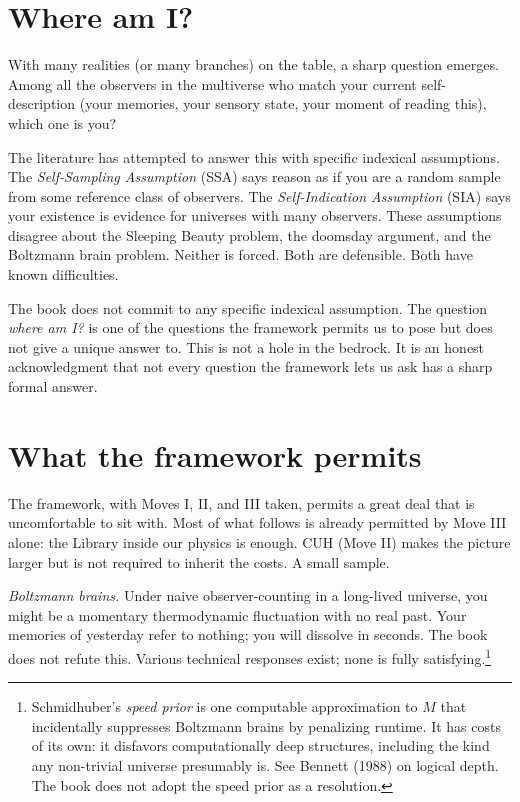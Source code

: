 \section*{Where am I?}

With many realities (or many branches) on the table, a sharp question emerges. Among all the observers in the multiverse who match your current self-description (your memories, your sensory state, your moment of reading this), which one is you?

The literature has attempted to answer this with specific indexical assumptions. The \emph{Self-Sampling Assumption} (SSA) says reason as if you are a random sample from some reference class of observers. The \emph{Self-Indication Assumption} (SIA) says your existence is evidence for universes with many observers. These assumptions disagree about the Sleeping Beauty problem, the doomsday argument, and the Boltzmann brain problem. Neither is forced. Both are defensible. Both have known difficulties.

The book does not commit to any specific indexical assumption. The question \emph{where am I?} is one of the questions the framework permits us to pose but does not give a unique answer to. This is not a hole in the bedrock. It is an honest acknowledgment that not every question the framework lets us ask has a sharp formal answer.

\section*{What the framework permits}

The framework, with Moves I, II, and III taken, permits a great deal that is uncomfortable to sit with. Most of what follows is already permitted by Move III alone: the Library inside our physics is enough. CUH (Move II) makes the picture larger but is not required to inherit the costs. A small sample.

\emph{Boltzmann brains.} Under naive observer-counting in a long-lived universe, you might be a momentary thermodynamic fluctuation with no real past. Your memories of yesterday refer to nothing; you will dissolve in seconds. The book does not refute this. Various technical responses exist; none is fully satisfying.\footnote{Schmidhuber's \emph{speed prior} is one computable approximation to $M$ that incidentally suppresses Boltzmann brains by penalizing runtime. It has costs of its own: it disfavors computationally deep structures, including the kind any non-trivial universe presumably is. See Bennett (1988) on logical depth. The book does not adopt the speed prior as a resolution.}

